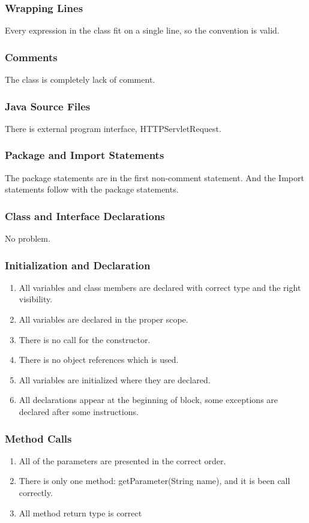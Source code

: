 \documentclass{article}
\begin{document}
\subsubsection{Wrapping Lines}
Every expression in the class fit on a single line, so the convention is valid.
\subsubsection{Comments}
The class is completely lack of comment.
 \subsubsection{Java Source Files}
 There is external program interface, HTTPServletRequest. 
 \subsubsection{Package and Import Statements}
 The package statements are in the first non-comment statement. And the Import statements follow with the package statements.
 \subsubsection{Class and Interface Declarations}
 No problem.
\subsubsection{Initialization and Declaration}
\begin{enumerate}
	\item 
	All variables and class members are declared with correct type and the right visibility.
	\item
	All variables are declared in the proper scope.
	\item
	There is no call for the constructor.
	\item
	There is no object references which is used.
	\item 
	All variables are initialized where they are declared.
	\item
	All declarations appear at the beginning of block, some exceptions are declared after some instructions.
\end{enumerate}

\subsubsection{Method Calls}
\begin{enumerate}
	\item All of the parameters are presented in the correct order.
	\item There is only one method: getParameter(String name), and it is been call correctly.
	\item All method return type is correct
\end{enumerate}
\end{document}
